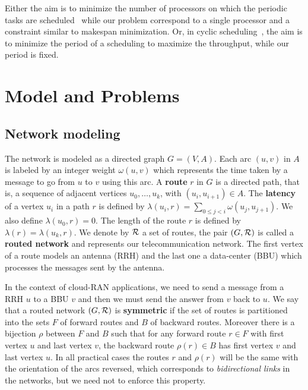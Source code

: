\documentclass[10pt, conference, letterpaper]{IEEEtran}
\begin{document}
Either the aim is to minimize the number of processors on which the periodic tasks are scheduled~\cite{korst1991periodic,hanen1993cyclic} while our problem correspond to a single processor and a constraint similar to makespan minimization. Or, in cyclic scheduling~\cite{levner2010complexity}, the aim is to minimize the period of a scheduling to maximize the throughput, while our period is fixed. 



\section{Model and Problems}\label{sec:def}

  \subsection{Network modeling}
  

The network is modeled as a directed graph $G=(V,A)$. Each arc  $(u,v)$ in $A$ is labeled by an integer weight $\omega(u,v)$ which represents the time taken by a message to go from $u$ to $v$ using this arc. A {\bf route} $r$ in $G$ is a directed path, that is, a sequence of adjacent vertices $u_0, \ldots , u_{k}$, with $(u_i,u_{i+1}) \in A$.  The {\bf latency} of a vertex $u_i$ in a path $r$ is defined by $\lambda(u_i,r)= \sum\limits_{0 \leq j <i} \omega(u_j, u_{j+1})$. We also define $\lambda(u_0,r)=0$. The length of the route $r$ is defined by $\lambda (r)= \lambda (u_k,r)$.
We denote by $\cal R$ a set of routes, the pair $(G,\cal R)$ is called a {\bf routed network} and represents our telecommunication network.
The first vertex of a route models an antenna (RRH) and the last one a data-center (BBU) which processes the messages sent by the antenna.

   In the context of cloud-RAN applications, we need to send a message from a RRH $u$ to a BBU $v$ and then 
      we must send the answer from $v$ back to $u$. We say that a routed network $(G, {\cal R})$ is \textbf{symmetric} if the set of routes is partitioned into the sets $F$ of forward routes and $B$ of backward routes. Moreover there is a bijection $\rho$ between $F$ and $B$ such that for any forward route $r \in F$ with first vertex $u$ and last vertex $v$, the backward route $\rho(r) \in B$ has first vertex $v$ and last vertex $u$. In all practical cases the routes $r$ and $\rho(r)$ will be the same with the orientation of the arcs reversed, which corresponds to \emph{bidirectional links} in the networks, but we need not to enforce this property.
         
\end{document}

